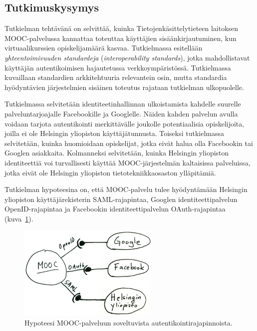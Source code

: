 \documentclass[finnish,gradu]{tktltiki}
\begin{document}



\subsection{Tutkimuskysymys} %
\label{sub:tutkimuskysymys}

Tutkielman tehtävänä on selvittää, kuinka Tietojenkäsittelytieteen laitoksen MOOC-palvelussa kannattaa toteuttaa käyttäjien sisäänkirjautuminen, kun virtuaalikurssien opiskelijamäärä kasvaa. Tutkielmassa esitellään \emph{yhteentoimivuuden standardeja} (\emph{interoperability standards}), jotka mahdollistavat käyttäjän autentikoimisen hajautetussa verkkoympäristössä. Tutkielmassa kuvaillaan standardien arkkitehtuuria relevantein osin, mutta standardia hyödyntävien järjestelmien sisäinen toteutus rajataan tutkielman ulkopuolelle.

Tutkielmassa selvitetään identiteetinhallinnan ulkoistamista kahdelle suurelle palveluntarjoajalle Facebookille ja Googlelle. Näiden kahden palvelun avulla voidaan tarjota autentikointi merkittävälle joukolle potentiaalisia opiskelijoita, joilla ei ole Helsingin yliopiston käyttäjätunnusta. Toiseksi tutkielmassa selvitetään, kuinka huomioidaan opiskelijat, jotka eivät halua olla Facebookin tai Googlen asiakkaita. Kolmanneksi selvitetään, kuinka Helsingin yliopiston identiteettiä voi turvallisesti käyttää MOOC-järjestelmän kaltaisissa palveluissa, jotka eivät ole Helsingin yliopiston tietotekniikkaosaston ylläpitämiä.

Tutkielman hypoteesina on, että MOOC-palvelu tulee hyödyntämään Helsingin yliopiston käyttäjärekisterin SAML-rajapintaa, Googlen identiteettipalvelun OpenID-rajapintaa ja Facebookin identiteettipalvelun OAuth-rajapintaa (kuva~\ref{fig:mooc-autentikointirajapinnat}).

\begin{figure}
  \centering
  \includegraphics[width=0.6\textwidth]{images/mooc-autentikointirajapinnat.jpg}
  \caption{Hypoteesi MOOC-palveluun soveltuvista autentikointirajapinnoista.}
  \label{fig:mooc-autentikointirajapinnat}
\end{figure}
\end{document}

